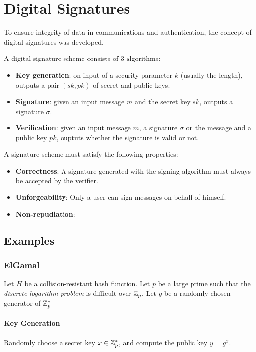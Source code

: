 \section{Digital Signatures}
To ensure integrity of data in communications and authentication, the concept of digital signatures was developed. 

A digital signature scheme consists of 3 algorithms:
\begin{itemize}
    \item \textbf{Key generation}: on input of a security parameter $k$ (usually the length), outputs a pair $(sk, pk)$ of secret and public keys.
    \item \textbf{Signature}: given an input message $m$ and the secret key $sk$, outputs a signature $\sigma$.
    \item \textbf{Verification}: given an input message $m$, a signature $\sigma$ on the message and a public key $pk$, ouptuts whether the signature is valid or not.
\end{itemize}

A signature scheme must satisfy the following properties:
\begin{itemize}
    \item \textbf{Correctness}: A signature generated with the signing algorithm must always be accepted by the verifier.
    \item \textbf{Unforgeability}: Only a user can sign messages on behalf of himself.
    \item \textbf{Non-repudiation}: 
\end{itemize}

\subsection{Examples}
\subsubsection{ElGamal}
Let $H$ be a collision-resistant hash function. Let $p$ be a large prime such that the \textit{discrete logarithm problem} is difficult over ${\mathbb Z}_p$. Let $g$ be a randomly chosen generator of ${\mathbb Z}_p^\ast$

\paragraph{Key Generation}

Randomly choose a secret key $x \in {\mathbb Z}_p^\ast$, and compute the public key $y = g^x$.

